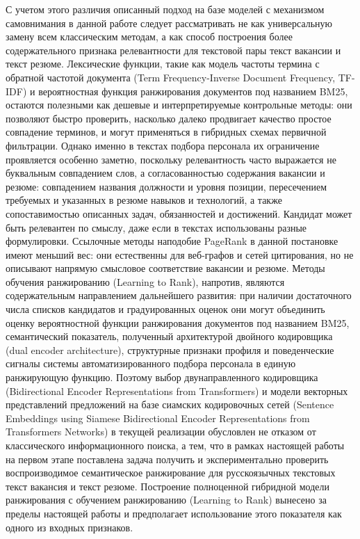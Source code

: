 С учетом этого различия описанный подход на базе моделей с механизмом самовнимания в данной работе следует рассматривать не как универсальную замену всем классическим методам, а как способ построения более содержательного признака релевантности для текстовой пары текст вакансии и текст резюме. Лексические функции, такие как модель частоты термина с обратной частотой документа (Term Frequency-Inverse Document Frequency, TF-IDF) и вероятностная функция ранжирования документов под названием BM25, остаются полезными как дешевые и интерпретируемые контрольные методы: они позволяют быстро проверить, насколько далеко продвигает качество простое совпадение терминов, и могут применяться в гибридных схемах первичной фильтрации. Однако именно в текстах подбора персонала их ограничение проявляется особенно заметно, поскольку релевантность часто выражается не буквальным совпадением слов, а согласованностью содержания вакансии и резюме: совпадением названия должности и уровня позиции, пересечением требуемых и указанных в резюме навыков и технологий, а также сопоставимостью описанных задач, обязанностей и достижений. Кандидат может быть релевантен по смыслу, даже если в текстах использованы разные формулировки. Ссылочные методы наподобие PageRank в данной постановке имеют меньший вес: они естественны для веб-графов и сетей цитирования, но не описывают напрямую смысловое соответствие вакансии и резюме. Методы обучения ранжированию (Learning to Rank), напротив, являются содержательным направлением дальнейшего развития: при наличии достаточного числа списков кандидатов и градуированных оценок они могут объединить оценку вероятностной функции ранжирования документов под названием BM25, семантический показатель, полученный архитектурой двойного кодировщика (dual encoder architecture), структурные признаки профиля и поведенческие сигналы системы автоматизированного подбора персонала в единую ранжирующую функцию. Поэтому выбор двунаправленного кодировщика (Bidirectional Encoder Representations from Transformers) и модели векторных представлений предложений на базе сиамских кодировочных сетей (Sentence Embeddings using Siamese Bidirectional Encoder Representations from Transformers Networks) в текущей реализации обусловлен не отказом от классического информационного поиска, а тем, что в рамках настоящей работы на первом этапе поставлена задача получить и экспериментально проверить воспроизводимое семантическое ранжирование для русскоязычных текстовых текст вакансия и текст резюме. Построение полноценной гибридной модели ранжирования с обучением ранжированию (Learning to Rank) вынесено за пределы настоящей работы и предполагает использование этого показателя как одного из входных признаков.


